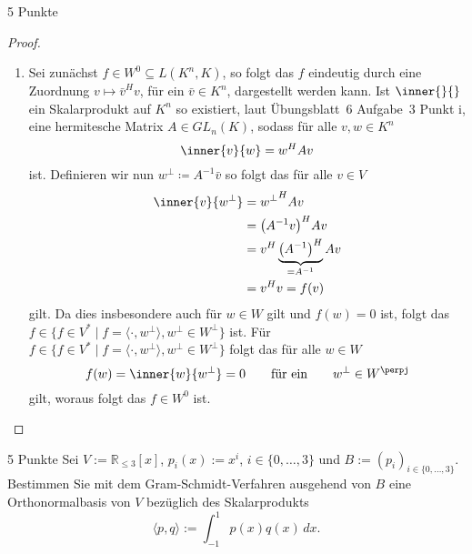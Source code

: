 \documentclass{problemset}
\begin{document}
\begin{problem}{5 Punkte}
\begin{proof}
\begin{enumerate}
        \item Sei zunächst \(f \in W^0 \subseteq L(K^n, K)\), so folgt das \(f\) eindeutig
              durch eine Zuordnung \(v \mapsto \bar{v}^H v\), für ein \(\bar{v} \in K^n\),
              dargestellt werden kann. Ist \(\inner{}{}\) ein Skalarprodukt auf \(K^n\) so
              existiert, laut Übungsblatt~6 Aufgabe~3 Punkt i, eine hermitesche Matrix \(A
              \in GL_n(K)\), sodass für alle \(v, w \in K^n\)
              \begin{equation*}
                  \inner{v}{w} = w^H A v
              \end{equation*}
              ist.
              Definieren wir nun \(w^\perp \coloneq A^{-1} \bar{v}\) so folgt das für alle \(v \in V\)
              \begin{align*}
                  \inner{v}{w^\perp} & = {w^\perp}^H A v                                        \\
                                     & = {\left(A^{-1}v\right)}^H A v                           \\
                                     & = v^H \underbrace{{\left(A^{-1}\right)}^H}_{=A^{-1}} A v \\
                                     & = v^H v = f(v)
              \end{align*}
              gilt.
              Da dies insbesondere auch für \(w \in W\) gilt und \(f(w) = 0\) ist, folgt das \(f \in \{f \in
              V^* \mid f = \langle \cdot , w^\perp \rangle, w^\perp \in W^\perp\}\) ist.
              Für \(f \in \{f \in
              V^* \mid f = \langle \cdot , w^\perp \rangle, w^\perp \in W^\perp\}\) folgt das für alle \(w \in W\)
              \begin{equation*}
                  f(w) = \inner{w}{w^\perp} = 0 \qquad \text{für ein} \qquad w^\perp \in W^\perpj
              \end{equation*}
              gilt, woraus folgt das \(f \in W^0\) ist.
    \end{enumerate}
\end{proof}

\end{problem}

\begin{problem}{5 Punkte}
Sei $V := \mathbb{R}_{\leq 3}[x]$, $p_i(x) := x^i$, $i \in \{0, \ldots, 3\}$
und $B := (p_i)_{i \in \{0, \ldots, 3\}}$. Bestimmen Sie mit dem
Gram-Schmidt-Verfahren ausgehend von $B$ eine Orthonormalbasis von $V$
bezüglich des Skalarprodukts
\[
    \langle p, q \rangle := \int_{-1}^{1} p(x) q(x) \, dx.
\]
\end{problem}
\end{document}
